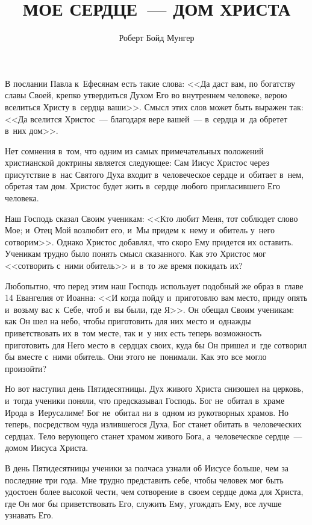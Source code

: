 \documentclass[12pt,article,a4paper,fittopage]{ncc}
\begin{document}
\titlepage
\title{МОЕ СЕРДЦЕ~--- ДОМ ХРИСТА}
\author{Роберт Бойд Мунгер}
\date{}
\maketitle
\thispagestyle{headings}
\setcounter{page}{1}
\begin{multicols}{2}
В послании Павла к~Ефесянам есть такие слова: <<Да даст вам, по богатству славы Своей, крепко утвердиться Духом Его во внутреннем человеке, верою вселиться Христу в~сердца ваши>>. Смысл этих слов может быть выражен так: <<Да вселится Христос~--- благодаря вере вашей~--- в~сердца и~да обретет в~них дом>>. 

Нет сомнения в~том, что одним из самых примечательных положений христианской доктрины является следующее: Сам Иисус Христос через присутствие в~нас Святого Духа входит в~человеческое сердце и~обитает в~нем, обретая там дом. Христос будет жить в~сердце любого пригласившего Его человека. 

Наш Господь сказал Своим ученикам: <<Кто любит Меня, тот соблюдет слово Мое; и~Отец Мой возлюбит его, и~Мы придем к~нему и~обитель у~него сотворим>>. Однако Христос добавлял, что скоро Ему придется их оставить. Ученикам трудно было понять смысл сказанного. Как это Христос мог <<сотворить с~ними обитель>> и~в~то же время покидать их?

Любопытно, что перед этим наш Господь использует подобный же образ в~главе 14 Евангелия от Иоанна: <<И когда пойду и~приготовлю вам место, приду опять и~возьму вас к~Себе, чтоб и~вы были, где Я>>. Он обещал Своим ученикам: как Он шел на небо, чтобы приготовить для них место и~однажды приветствовать их в~том месте, так и~у них есть теперь возможность приготовить для Него место в~сердцах своих, куда бы Он пришел и~где сотворил бы вместе с~ними обитель. Они этого не~понимали. Как это все могло произойти?

Но вот наступил день Пятидесятницы. Дух живого Христа снизошел на церковь, и~тогда ученики поняли, что предсказывал Господь. Бог не~обитал в~храме Ирода в~Иерусалиме! Бог не~обитал ни в~одном из рукотворных храмов. Но теперь, посредством чуда излившегося Духа, Бог станет обитать в~человеческих сердцах. Тело верующего станет храмом живого Бога, а~человеческое сердце~--- домом Иисуса Христа.

В день Пятидесятницы ученики за полчаса узнали об Иисусе больше, чем за последние три года. Мне трудно представить себе, чтобы человек мог быть удостоен более высокой чести, чем сотворение в~своем сердце дома для Христа, где Он мог бы приветствовать Его, служить Ему, угождать Ему, все лучше узнавать Его. 


\end{multicols}
\end{document}
